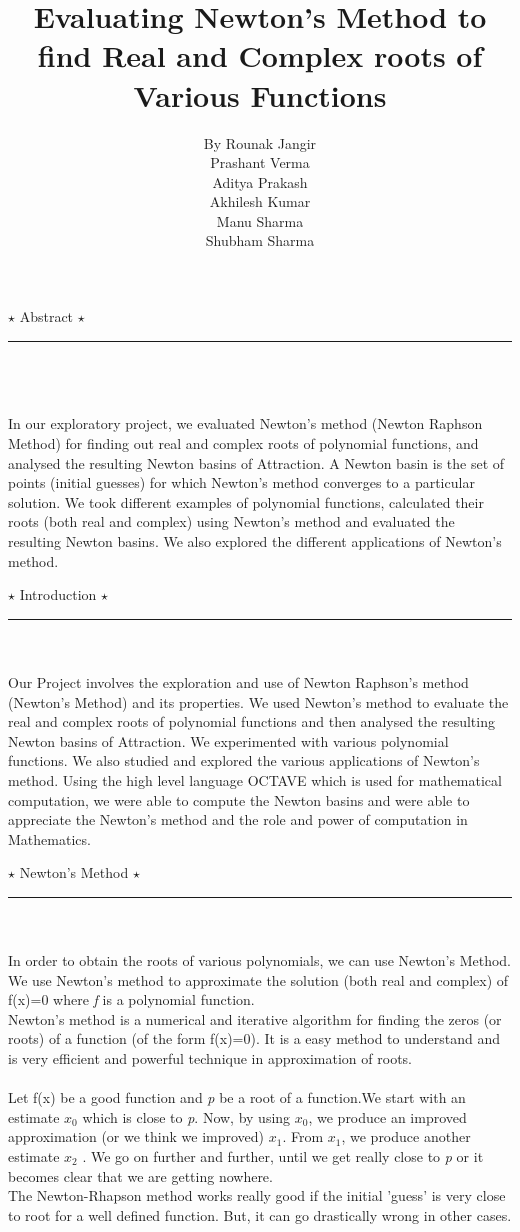 \documentclass[15pt]{report}
\title{Evaluating Newton's Method to find Real and Complex roots of Various Functions}
\author{By Rounak Jangir \\Prashant Verma\\ Aditya Prakash \\Akhilesh Kumar\\ Manu Sharma \\Shubham Sharma }
\begin{document}
\maketitle
\newpage
{\huge$\star$ Abstract $\star$}\\
\noindent\rule{12 cm}{1 pt}\\ \\ \\
In our exploratory project, we evaluated Newton’s method (Newton Raphson Method) for finding out real and complex roots of polynomial functions, and analysed the resulting Newton basins of Attraction. A Newton basin is the set of points (initial guesses) for which Newton’s method converges to a particular solution. We took different examples of polynomial functions, calculated their roots (both real and complex) using Newton's method and evaluated the resulting Newton basins.
We also explored the different applications of Newton's method.
\newpage

{\huge$\star$ Introduction $\star$}\\
\noindent\rule{12 cm}{1 pt}\\ \\
Our Project involves the exploration and use of Newton Raphson’s method (Newton’s Method) and its properties. We used Newton's method to evaluate the real and complex  roots of polynomial functions and then analysed the resulting Newton basins of Attraction. We experimented with various polynomial functions. We also studied and explored the various applications of Newton's method. Using the high level language OCTAVE which is used for mathematical computation, we were able to compute the Newton basins and were able to appreciate the Newton's method and the role and power of computation in Mathematics.
\newpage 

{\huge$\star$ Newton's Method $\star$}\\
\noindent\rule{12cm}{1 pt}\\ \\
In order to obtain the roots of various polynomials, we can use Newton's Method.
We use Newton's method to approximate the solution (both real and complex) of f(x)=0 where \textit{f} is a polynomial function.\\
Newton’s method is a numerical and iterative algorithm for finding the zeros (or roots) of a function (of the form f(x)=0). It is a easy method to understand and is very efficient and powerful technique in approximation of roots.\\ \\
Let f(x) be a good function and \textit{p} be a root of a function.We start with an estimate $x_{0}$ which is close to \textit{p}. Now, by using $x_{0}$, we produce an improved approximation (or we think we improved) $x_{1}$. From $x_{1}$, we produce another estimate $ x_{2}$ . We go on further and further, until we get really close to \textit{p} or it becomes clear that we are getting nowhere.\\
The Newton-Rhapson method works really good if the initial 'guess' is very close to root for a well defined function. But, it can go drastically wrong in other cases.\\
\end{document}
